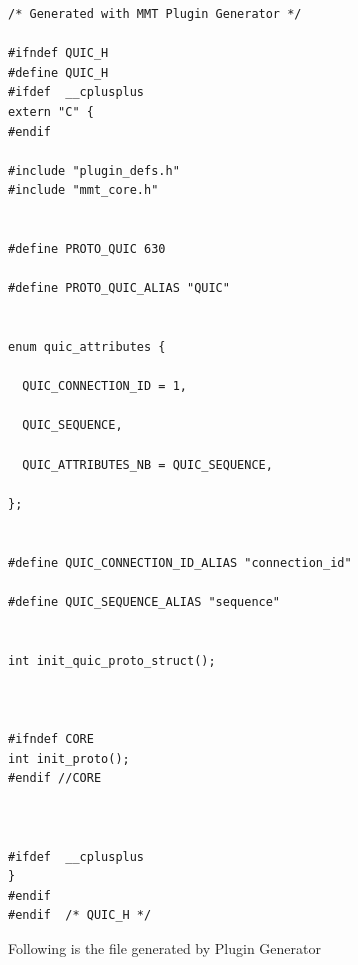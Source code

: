 \begin{lstlisting}[style=Cpp]
/* Generated with MMT Plugin Generator */

#ifndef QUIC_H
#define QUIC_H
#ifdef  __cplusplus
extern "C" {
#endif

#include "plugin_defs.h"
#include "mmt_core.h"


#define PROTO_QUIC 630

#define PROTO_QUIC_ALIAS "QUIC"


enum quic_attributes {

  QUIC_CONNECTION_ID = 1,

  QUIC_SEQUENCE,

  QUIC_ATTRIBUTES_NB = QUIC_SEQUENCE,

};


#define QUIC_CONNECTION_ID_ALIAS "connection_id"

#define QUIC_SEQUENCE_ALIAS "sequence"


int init_quic_proto_struct();



#ifndef CORE
int init_proto();
#endif //CORE



#ifdef  __cplusplus
}
#endif
#endif  /* QUIC_H */

\end{lstlisting}

Following is the  file generated by Plugin Generator

